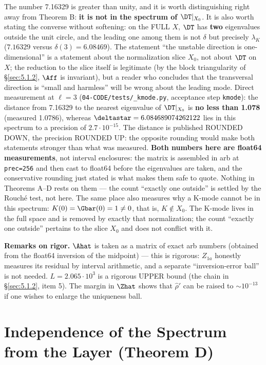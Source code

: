 The number 7.16329 is greater than unity, and it is worth
distinguishing right away from Theorem B: \textbf{it is not in the spectrum
of $\DT|_{X_{0}}$}. It is also worth stating the converse without
softening: on the FULL $X$, $\DT$ has \textbf{two} eigenvalues outside the
unit circle, and the leading one among them is not $\delta$ but precisely
$\lambda_K$ ($7.16329$ versus $\delta(3) = 6.08469$). The statement ``the
unstable direction is one-dimensional'' is a statement about the
normalization slice $X_{0}$, not about $\DT$ on $X$; the reduction to the
slice itself is legitimate (by the block triangularity of \S\ref{sec:5.1.2},
$\Aff$ is invariant), but a reader who concludes that the transversal
direction is ``small and harmless'' will be wrong about the leading
mode. Direct measurement at $\ell=3$ (\texttt{04-\allowbreak CODE/\allowbreak tests/\allowbreak \_\allowbreak kmode.py},
acceptance step \texttt{kmode}): the distance from 7.16329 to the nearest
eigenvalue of $\DT|_{X_{0}}$ is \textbf{no less than 1.078} (measured 1.0786),
whereas $\deltastar = 6.084689074262122$ lies in this spectrum to a precision
of $2.7\cdot 10^{-15}$. The distance is published ROUNDED DOWN, the precision
ROUNDED UP: the opposite rounding would make both statements stronger
than what was measured.
\textbf{Both numbers here are float64 measurements}, not interval enclosures:
the matrix is assembled in arb at \texttt{prec=256} and then cast to float64
before the eigenvalues are taken, and the conservative rounding just stated is
what makes them safe to quote. Nothing in Theorems A--D rests on them --- the
count ``exactly one outside'' is settled by the Rouch\'e test, not here. The same place also measures why a K-mode
cannot be in this spectrum: $K(0) = \Gbar(0) = 1 \ne 0$, that is,
$K \notin X_{0}$. The K-mode lives in the full space and is removed by
exactly that normalization; the count ``exactly one outside'' pertains
to the slice $X_{0}$ and does not conflict with it.

\textbf{Remarks on rigor.} $\Ahat$ is taken as a matrix of exact arb numbers
(obtained from the float64 inversion of the midpoint) --- this is
rigorous: $Z_{1a}$ honestly measures its residual by interval
arithmetic, and a separate ``inversion-error ball'' is not needed.
$L = 2.065\cdot 10^3$ is a rigorous UPPER bound (the chain in \S\ref{sec:5.1.2}, item
5). The margin in $\Zhat$ shows that $\hat\rho'$ can be raised to $\sim 10^{-13}$ if one
wishes to enlarge the uniqueness ball.



\section{Independence of the Spectrum from the Layer (Theorem D)}
\label{sec:10}

